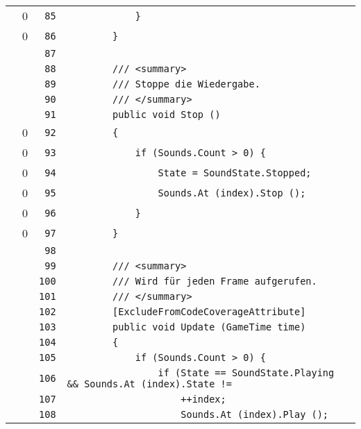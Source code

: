 \documentclass[a4paper,10pt]{article}
\begin{document}
\begin{longtable}[l]{lrrl}
\cellcolor{red} & 0 & \verb~85~ & \verb~            }~\\
\cellcolor{red} & 0 & \verb~86~ & \verb~        }~\\
\cellcolor{gray} &  & \verb~87~ & \verb~~\\
\cellcolor{gray} &  & \verb~88~ & \verb~        /// <summary>~\\
\cellcolor{gray} &  & \verb~89~ & \verb~        /// Stoppe die Wiedergabe.~\\
\cellcolor{gray} &  & \verb~90~ & \verb~        /// </summary>~\\
\cellcolor{gray} &  & \verb~91~ & \verb~        public void Stop ()~\\
\cellcolor{red} & 0 & \verb~92~ & \verb~        {~\\
\cellcolor{red} & 0 & \verb~93~ & \verb~            if (Sounds.Count > 0) {~\\
\cellcolor{red} & 0 & \verb~94~ & \verb~                State = SoundState.Stopped;~\\
\cellcolor{red} & 0 & \verb~95~ & \verb~                Sounds.At (index).Stop ();~\\
\cellcolor{red} & 0 & \verb~96~ & \verb~            }~\\
\cellcolor{red} & 0 & \verb~97~ & \verb~        }~\\
\cellcolor{gray} &  & \verb~98~ & \verb~~\\
\cellcolor{gray} &  & \verb~99~ & \verb~        /// <summary>~\\
\cellcolor{gray} &  & \verb~100~ & \verb~        /// Wird für jeden Frame aufgerufen.~\\
\cellcolor{gray} &  & \verb~101~ & \verb~        /// </summary>~\\
\cellcolor{gray} &  & \verb~102~ & \verb~        [ExcludeFromCodeCoverageAttribute]~\\
\cellcolor{gray} &  & \verb~103~ & \verb~        public void Update (GameTime time)~\\
\cellcolor{gray} &  & \verb~104~ & \verb~        {~\\
\cellcolor{gray} &  & \verb~105~ & \verb~            if (Sounds.Count > 0) {~\\
\cellcolor{gray} &  & \verb~106~ & \verb~                if (State == SoundState.Playing && Sounds.At (index).State != ~\\
\cellcolor{gray} &  & \verb~107~ & \verb~                    ++index;~\\
\cellcolor{gray} &  & \verb~108~ & \verb~                    Sounds.At (index).Play ();~\\

\end{longtable}
\end{document}
